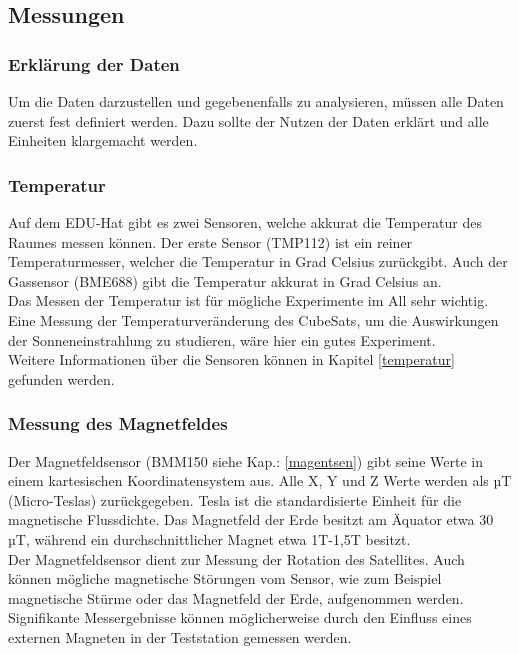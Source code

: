 \newpage

\SecAuth{\nameCZ}

\subsection{Messungen}\label{Messungen}
\subsubsection{Erklärung der Daten}
Um die Daten darzustellen und gegebenenfalls zu analysieren, müssen alle Daten zuerst fest definiert werden. Dazu sollte der Nutzen der Daten erklärt und alle Einheiten klargemacht werden. 

\subsubsection{Temperatur }
Auf dem EDU-Hat gibt es zwei Sensoren, welche akkurat die Temperatur des Raumes messen können. Der erste Sensor (TMP112) ist ein reiner Temperaturmesser, welcher die Temperatur in Grad Celsius zurückgibt. Auch der Gassensor (BME688) gibt die Temperatur akkurat in Grad Celsius an. \\
\vspace{3mm}
Das Messen der Temperatur ist für mögliche Experimente im All sehr wichtig. Eine Messung der Temperaturveränderung des CubeSats, um die Auswirkungen der Sonneneinstrahlung zu studieren, wäre hier ein gutes Experiment.\\
\vspace{3mm}
Weitere Informationen über die Sensoren können in Kapitel \ref{temperatur} gefunden werden.

\subsubsection{Messung des Magnetfeldes}
Der Magnetfeldsensor (BMM150 siehe Kap.: \ref{magentsen}) gibt seine Werte in einem kartesischen Koordinatensystem aus. Alle X, Y und Z Werte werden als µT (Micro-Teslas) zurückgegeben. Tesla ist die standardisierte Einheit für die magnetische Flussdichte. Das Magnetfeld der Erde besitzt am Äquator etwa 30 µT\autocite{Erdmagnetfeld}, während ein durchschnittlicher Magnet etwa 1T-1,5T besitzt.\\
\vspace{3mm}
Der Magnetfeldsensor dient zur Messung der Rotation des Satellites. Auch können mögliche magnetische Störungen vom Sensor, wie zum Beispiel magnetische Stürme oder das Magnetfeld der Erde, aufgenommen werden.\\
\vspace{3mm}
Signifikante Messergebnisse können möglicherweise durch den Einfluss eines externen Magneten in der Teststation gemessen werden.
\newpage

